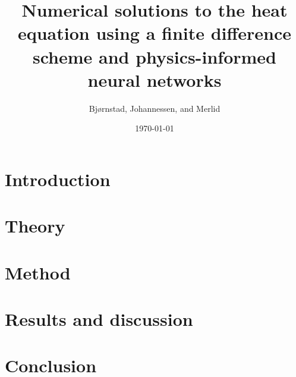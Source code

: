 \documentclass[aps,rmp,reprint,amsmath,amssymb,twocolumn,floatfix]{revtex4-1}
\begin{document}
\title{Numerical solutions to the heat equation using a finite difference scheme and physics-informed neural networks }

\author{Bjørnstad, Johannessen, and Merlid}
\date{\today}


\begin{abstract}

\end{abstract}
\maketitle

\tableofcontents

\section{Introduction}
\label{sec:introduction}

\section{Theory}


\section{Method}\label{sec:methods3}


\section{Results and discussion}\label{sec:results_and_discussion}


%

\section{Conclusion}\label{sec:conclucion5}


\clearpage
{} %


\clearpage
\appendix
\label{appendix}

\clearpage
\end{document}
